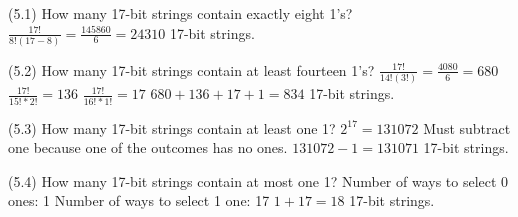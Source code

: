 \documentclass[11pt]{article}
\begin{document}
\noindent
(5.1) How many {\color{red}17}-bit strings contain exactly {\color{red}eight} 1's?
\newline
\newline
$\frac{17!}{8!(17-8)} = \frac{145860}{6} = 24310$ 17-bit strings.
\newline
\newline
\newline


\noindent
(5.2) How many {\color{red}17}-bit strings contain at least {\color{red}fourteen} 1's?
\newline
\newline
$\frac{17!}{14!(3!)} = \frac{4080}{6} = 680$ 
\newline
$\frac{17!}{15! * 2!} = 136$
\newline
$\frac{17!}{16! * 1!} = 17$
\newline
$680 + 136 + 17 + 1 = 834$ 17-bit strings.
\newline


\noindent
(5.3) How many {\color{red}17}-bit strings contain at least {\color{red}one} 1?
\newline
\newline
$2^{17} = 131072$
\newline
Must subtract one because one of the outcomes has no ones.
\newline
$131072 - 1 = 131071$ 17-bit strings.
\newline

\noindent
(5.4) How many {\color{red}17}-bit strings contain at most {\color{red}one} 1?
\newline
\newline
Number of ways to select 0 ones: 1
\newline
Number of ways to select 1 one: 17
\newline
$1 + 17 = 18$ 17-bit strings.
\newline
\newline
\end{document}
